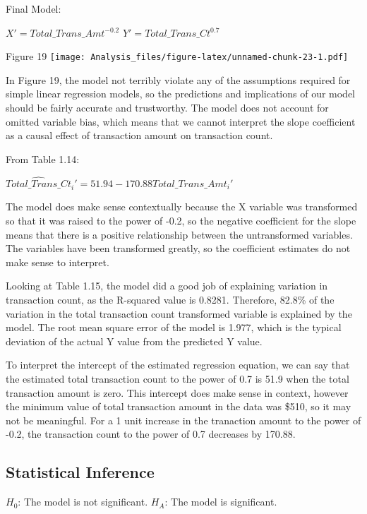 \documentclass[
]{article}
\begin{document}
Final Model:

\(X' = Total\_Trans\_Amt^{-0.2}\) \(Y' = Total\_Trans\_Ct^{0.7}\)

Figure 19
\texttt{[image: Analysis\_files/figure-latex/unnamed-chunk-23-1.pdf]}

In Figure 19, the model not terribly violate any of the assumptions
required for simple linear regression models, so the predictions and
implications of our model should be fairly accurate and trustworthy. The
model does not account for omitted variable bias, which means that we
cannot interpret the slope coefficient as a causal effect of transaction
amount on transaction count.

From Table 1.14:

\(\widehat{Total\_Trans\_Ct}_i'=51.94 -170.88 Total\_Trans\_Amt_i'\)

The model does make sense contextually because the X variable was
transformed so that it was raised to the power of -0.2, so the negative
coefficient for the slope means that there is a positive relationship
between the untransformed variables. The variables have been transformed
greatly, so the coefficient estimates do not make sense to interpret.

Looking at Table 1.15, the model did a good job of explaining variation
in transaction count, as the R-squared value is 0.8281. Therefore,
82.8\% of the variation in the total transaction count transformed
variable is explained by the model. The root mean square error of the
model is 1.977, which is the typical deviation of the actual Y value
from the predicted Y value.

To interpret the intercept of the estimated regression equation, we can
say that the estimated total transaction count to the power of 0.7 is
51.9 when the total transaction amount is zero. This intercept does make
sense in context, however the minimum value of total transaction amount
in the data was \$510, so it may not be meaningful. For a 1 unit
increase in the tranaction amount to the power of -0.2, the transaction
count to the power of 0.7 decreases by 170.88.

\hypertarget{statistical-inference}{%
\subsection{Statistical Inference}\label{statistical-inference}}

\(H_0\): The model is not significant. \(H_A\): The model is
significant.
\end{document}
